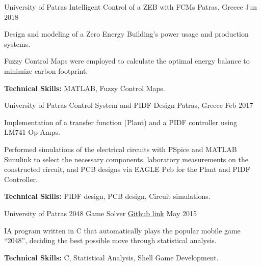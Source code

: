 \begin{cventries}
  \cventry
    {University of Patras} %
    {Intelligent Control of a ZEB with FCMs} %
    {Patras, Greece} %
    {Jun 2018} %
    {
      \begin{cvitems} %
        \item {Design and modeling of a Zero Energy Building's power usage and production systems.}
        \item {Fuzzy Control Maps were employed to calculate the optimal energy balance to minimize carbon footprint.}
        \item {\textbf{Technical Skills:} MATLAB, Fuzzy Control Maps.}
      \end{cvitems}
    }

  \cventry
    {University of Patras} %
    {Control System and PIDF Design} %
    {Patras, Greece} %
    {Feb 2017} %
    {
      \begin{cvitems} %
        \item {Implementation of a transfer function (Plant) and a PIDF controller using LM741 Op-Amps.}
        \item {Performed simulations of the electrical circuits with PSpice and MATLAB Simulink to select the necessary components, laboratory measurements on the constructed circuit, and PCB designs via EAGLE Pcb for the Plant and PIDF Controller.}
        \item {\textbf{Technical Skills:} PIDF design, PCB design, Circuit simulations.}
      \end{cvitems}
    }

  \cventry
    {University of Patras} %
    {2048 Game Solver } %
    {\href{https://github.com/Panagiotis-Zachos/2048_AutoPlay}{Github link}} %
    {May 2015} %
    {
      \begin{cvitems} %
        \item {IA program written in C that automatically plays the popular mobile game “2048”, deciding the best possible move through statistical analysis.}
        \item {\textbf{Technical Skills:} C, Statistical Analysis, Shell Game Development.}
      \end{cvitems}
    }

\end{cventries}
